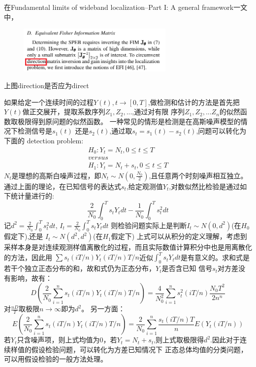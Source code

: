 \documentclass[12pt]{article}
\begin{document}
\title{\textbf{}} 

\author{}
\maketitle
\large
在Fundamental limits of wideband localization--Part I: A general framework一文中，

\begin{figure}[!ht]
\centering
\includegraphics[width=3.0in]{001.png}
\end{figure}

上图direction是否应为direct

如果给定一个连续时间的过程$Y(t),t \to [0,T]$,做检测和估计的方法是首先把$Y(t)$做正交展开，提取系数序列$Z_1,Z_2,...$,通过对有限
序列$Z_1,Z_2,...Z_n$的似然函数取极限得到原问题的似然函数。
一种常见的情形是检测是在高斯噪声模型的情况下检测信号是$s_1(t)$
还是$s_2(t)$,通过取$s_t=s_1(t)-s_2(t)$,问题可以转化为下面的
detection problem:
\begin{equation}
\begin{split}
H_0: Y_t=N_t,0 \leq t \leq T \\
versus\\
H_1:Y_t=N_t+s_t,0 \leq t \leq T 
\end{split}
\end{equation}
$N_t$是理想的高斯白噪声过程，即$N_t \sim N(0,\frac{N_0}{2})$,且任意两个时刻噪声相互独立。通过上面的理论，在已知信号的表达式$s_t$,给定观测值$Y_t$,对数似然比检验是通过如下统计量进行的:
\begin{equation}
\frac{2}{N_0}\int_0^T s_t Y_t dt -\frac{1}{N_0}\int_0^T s_t^2 dt
\end{equation}
记$d^2=\frac{2}{N_0}\int_0^T s_t^2 dt$,
$I_t=\frac{2}{N_0}\int_0^T s_t Y_t dt$
则检验问题实际上是判断$I_t \sim N(0,d^2)$(在$H_0$假定下),还是
$I_t \sim N(d^2,d^2)$(在$H_1$假定下)
上式可以从积分的定义理解，考虑到采样本身是对连续观测样值离散化的过程，而且实际数值计算积分中也是用离散化的方法，因此用
$\sum s_t(iT/n)Y_t(iT/n)T/n$近似$\int_0^T s_t Y_t dt$是有意义的。求和式是若干个独立正态分布的和，故和式仍为正态分布，$Y_t$是否含已知
信号$s_t$对方差没有影响，故有：
\begin{equation}
D(\frac{2}{N_0}\sum_{i=1}^n s_t(iT/n)Y_t(iT/n)T/n)=\frac{4}{N_0^2}\sum_{i=1}^n s_t^2(iT/n)\frac{N_0T^2}{2n^n}
\end{equation}
对$\frac{nD}{T}$取极限$n \rightarrow \infty $即为$d^2$。
另一方面：
\begin{equation}
E(\frac{2}{N_0}\sum_{i=1}^n s_t(iT/n)Y_t(iT/n)T/n)=\frac{2}{N_0} \sum_{i=1}^n \frac{s_t(iT/n)T}{n}E(Y_t(iT/n))
\end{equation}
若$Y_t$只含噪声项，则上式均值为0，若$Y_t=N_t+s_t$,则上式取极限得$d^2$.因此对于连续样值的假设检验问题，可以转化为方差已知情况下
正态总体均值的分类问题，可以用假设检验的一般方法处理。
\end{document}
